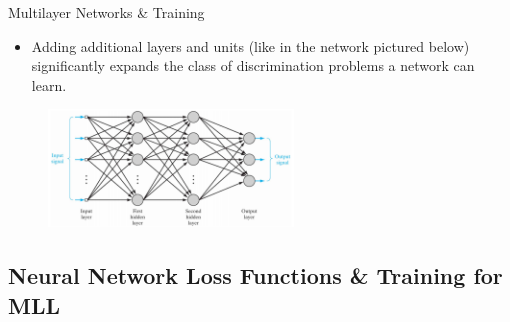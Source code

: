 \documentclass{beamer}
\begin{document}
\begin{frame}[t]{Multilayer Networks \& Training}
    \begin{itemize}
        \item 
        Adding additional layers and units (like in the network pictured below) significantly expands the class of discrimination problems a network can learn.
        
        
    \end{itemize}
    
    \begin{figure}[htp]
        \centering
        \includegraphics[width = 6.5cm]{multilayer_network_Haykin.PNG}
    \end{figure}
\end{frame}

\subsection{Neural Network Loss Functions \& Training for MLL}
\end{document}
